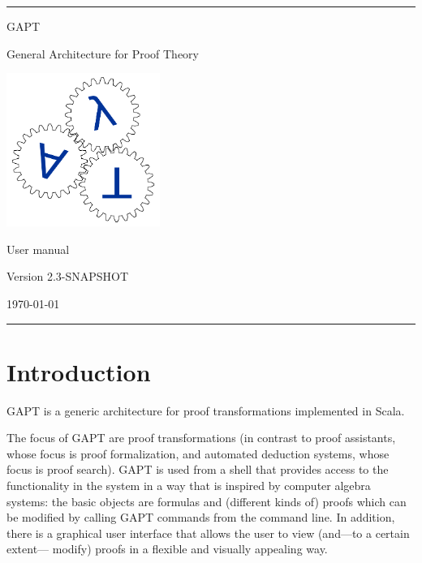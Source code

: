 \documentclass[a4paper,11pt]{article}
\begin{document}
\begin{titlepage}
\begin{center}

\hrule

\vspace*{20mm}

{\Huge GAPT}

\vspace*{5mm}

{\huge General Architecture for Proof Theory}

\vspace*{20mm}

\includegraphics[keepaspectratio,width=5cm]{logo}

\vspace*{20mm}

{\Huge User manual}

\vspace*{10mm}
{\Large Version 2.3-SNAPSHOT}
\vspace*{10mm}

{\Large \today}

\vspace*{20mm}

\hrule
\end{center}

\end{titlepage}

\listoffixmes

\tableofcontents
\vfill
\pagebreak

\section{Introduction}

GAPT is a generic architecture for proof transformations implemented in Scala.

The focus of GAPT are proof transformations (in contrast to proof assistants,
whose focus is proof formalization, and automated deduction systems, whose focus
is proof search). GAPT is used from a shell that provides access to the functionality
in the system in a way that is inspired by computer algebra systems: the basic
objects are formulas and (different kinds of) proofs which can be modified
by calling GAPT commands from the command line. In addition, there
is a graphical user interface that allows the user to view (and—to a certain extent—
modify) proofs in a flexible and visually appealing way.
\end{document}
